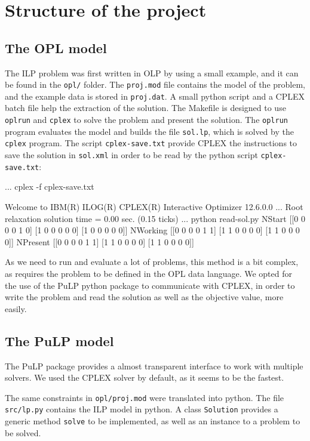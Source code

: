 \documentclass[12pt,a4paper]{article}
\begin{document}
\section{Structure of the project}

\subsection{The OPL model}

The ILP problem was first written in OLP by using a small example, and it can be 
found in the \texttt{opl/} folder. The \texttt{proj.mod} file contains the model 
of the problem, and the example data is stored in \texttt{proj.dat}. A small 
python script and a CPLEX batch file help the extraction of the solution. The 
Makefile is designed to use \texttt{oplrun} and \texttt{cplex} to solve the 
problem and present the solution. The \texttt{oplrun} program evaluates the 
model and builds the file \texttt{sol.lp}, which is solved by the \texttt{cplex} 
program. The script \texttt{cplex-save.txt} provide CPLEX the instructions to 
save the solution in \texttt{sol.xml} in order to be read by the python script 
\texttt{cplex-save.txt}:

\begin{textcode}
...
cplex -f cplex-save.txt

Welcome to IBM(R) ILOG(R) CPLEX(R) Interactive Optimizer 12.6.0.0
...
Root relaxation solution time = 0.00 sec. (0.15 ticks)
...
python read-sol.py
NStart
[[0 0 0 0 1 0]
 [1 0 0 0 0 0]
 [1 0 0 0 0 0]]
NWorking
[[0 0 0 0 1 1]
 [1 1 0 0 0 0]
 [1 1 0 0 0 0]]
NPresent
[[0 0 0 0 1 1]
 [1 1 0 0 0 0]
 [1 1 0 0 0 0]]
\end{textcode}

As we need to run and evaluate a lot of problems, this method is a bit complex, 
as requires the problem to be defined in the OPL data language.  We opted for 
the use of the PuLP python package to communicate with CPLEX, in order to write 
the problem and read the solution as well as the objective value, more easily.

\subsection{The PuLP model}

The PuLP package provides a almost transparent interface to work with multiple 
solvers. We used the CPLEX solver by default, as it seems to be the fastest.

The same constraints in \texttt{opl/proj.mod} were translated into python. The 
file \texttt{src/lp.py} contains the ILP model in python. A class 
\texttt{Solution} provides a generic method \texttt{solve} to be implemented, as 
well as an instance to a problem to be solved.
\end{document}
